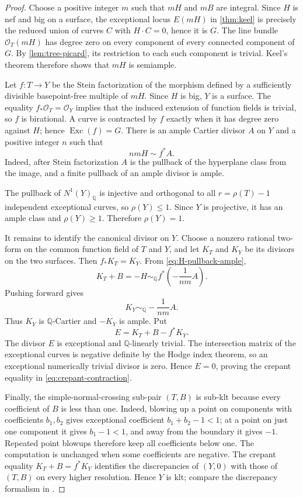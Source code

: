 \documentclass[11pt,reqno]{amsart}
\theoremstyle{definition}
\theoremstyle{remark}
\DeclareMathOperator{\Exc}{Exc}
\newcommand{\QQ}{\mathbb Q}
\newcommand{\cO}{\mathcal O}
\numberwithin{equation}{section}
\begin{document}
\begin{proof}
Choose a positive integer $m$ such that $mH$ and $mB$ are integral.  Since $H$ is nef and big on a surface, the exceptional locus $E(mH)$ in \cref{thm:keel} is precisely the reduced union of curves $C$ with $H\cdot C=0$, hence it is $G$.  The line bundle $\cO_T(mH)$ has degree zero on every component of every connected component of $G$.  By \cref{lem:tree-picard}, its restriction to each such component is trivial.  Keel's theorem therefore shows that $mH$ is semiample.

Let $f:T\to Y$ be the Stein factorization of the morphism defined by a sufficiently divisible basepoint-free multiple of $mH$.  Since $H$ is big, $Y$ is a surface.  The equality $f_*\cO_T=\cO_Y$ implies that the induced extension of function fields is trivial, so $f$ is birational.  A curve is contracted by $f$ exactly when it has degree zero against $H$; hence $\Exc(f)=G$.  There is an ample Cartier divisor $A$ on $Y$ and a positive integer $n$ such that
\begin{equation}\label{eq:H-pullback-ample}
  nmH\sim f^*A.
\end{equation}
Indeed, after Stein factorization $A$ is the pullback of the hyperplane class from the image, and a finite pullback of an ample divisor is ample.

The pullback of $N^1(Y)_{\QQ}$ is injective and orthogonal to all
$r=\rho(T)-1$ independent exceptional curves, so $\rho(Y)\le1$.
Since $Y$ is projective, it has an ample class and $\rho(Y)\ge1$.
Therefore $\rho(Y)=1$.

It remains to identify the canonical divisor on $Y$.  Choose a nonzero rational two-form on the common function field of $T$ and $Y$, and let $K_T$ and $K_Y$ be its divisors on the two surfaces.  Then $f_*K_T=K_Y$.  From \eqref{eq:H-pullback-ample},
\[
  K_T+B=-H\sim_\QQ f^*\!\left(-\frac{1}{nm}A\right).
\]
Pushing forward gives
\[
  K_Y\sim_\QQ-\frac{1}{nm}A.
\]
Thus $K_Y$ is $\QQ$-Cartier and $-K_Y$ is ample.  Put
\[
  E=K_T+B-f^*K_Y.
\]
The divisor $E$ is exceptional and $\QQ$-linearly trivial.  The intersection matrix of the exceptional curves is negative definite by the Hodge index theorem, so an exceptional numerically trivial divisor is zero.  Hence $E=0$, proving the crepant equality in \eqref{eq:crepant-contraction}.

Finally, the simple-normal-crossing sub-pair $(T,B)$ is sub-klt
because every coefficient of $B$ is less than one. Indeed, blowing up
a point on components with coefficients $b_1,b_2$ gives exceptional
coefficient $b_1+b_2-1<1$; at a point on just one component it gives
$b_1-1<1$, and away from the boundary it gives $-1$. Repeated point
blowups therefore keep all coefficients below one. The computation is unchanged when some
coefficients are negative.  The crepant equality $K_T+B=f^*K_Y$ identifies the discrepancies of $(Y,0)$ with those of $(T,B)$ on every higher resolution.  Hence $Y$ is klt; compare the discrepancy formalism in \cite[Section~2.3]{KollarMori}.
\end{proof}
\end{document}
